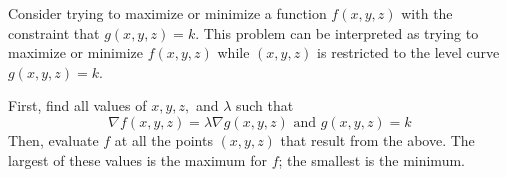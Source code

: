 Consider trying to maximize or minimize a function $f(x,y,z)$ with the constraint that $g(x,y,z) = k$. This problem can be interpreted as trying to maximize or minimize $f(x,y,z)$ while $(x,y,z)$ is restricted to the level curve $g(x,y,z)=k$.

First, find all values of $x, y, z,$ and $\lambda$ such that $$\nabla f(x,y,z) = \lambda \nabla g(x,y,z) \text{ and } g(x,y,z) = k$$ Then, evaluate $f$ at all the points $(x,y,z)$ that result from the above. The largest of these values is the maximum for $f$; the smallest is the minimum.

\begin{comment}

\section{Level Curves}

A \textbf{level curve} (or \textbf{level plane}) can be thought of as a horizontal cross-section or topographical height map. The level curve or plane is always one dimension less than the function the level curve is taken from.

The level curve at $c$ is represented by a vector function such as $\vec{r}(t) = x(t)\hat{i} + y(t)\hat{j}$, so the function for the level curve is $f(x(t)\hat{i}, y(t)\hat{j}) = c$. $\vec{r}'(t)$ gives the slope of the tangent vector of the level curve.

$f'(x(t)\hat{i}, y(t)\hat{j}) = 0$

$\displaystyle{\frac{\partial f}{\partial y} \cdot \frac{\partial y}{\partial t} + \frac{\partial f}{\partial x} \cdot \frac{\partial x}{\partial t}} = 0$

$\nabla f(x,y) \cdot \vec{r}(t)=0$

This means that $\nabla f(x,y)$ and $\vec{r}(t)$ are orthogonal, so $\nabla f$ is the normal vector to any point on a level curve.

Example: Find the tangent line and normal line to $x^{2} - y^{2} = 16$ @ $P(5, 3)$ (this function is 2-dimensional)

Let the above function be a level curve for some surface in $\mathbb{R}^{3}$. So, $f(x, y) = x^{2} + y^{2}$ (this function is 3-dimensional, and the constant $16$ can be included or excluded with no change) and $x^{2} - y^{2} = 16$ is the level curve at $16$.

$\nabla f (x, y) = \begin{bmatrix}2x\hat{i} + 2y\hat{j}\end{bmatrix}$


\end{comment}
